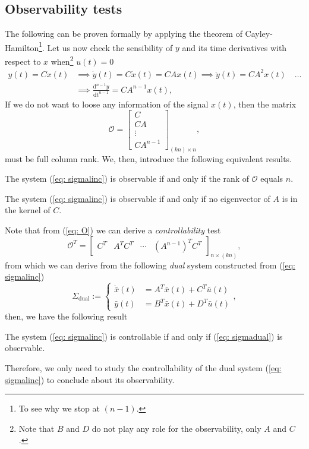 \subsection{Observability tests}
The following can be proven formally by applying the theorem of Cayley-Hamilton\footnote{To see why we stop at $(n-1)$.}. Let us now check the sensibility of $y$ and its time derivatives with respect to $x$ when\footnote{Note that $B$ and $D$ do not play any role for the observability, only $A$ and $C$.} $u(t)=0$
\begin{align}
	y(t) = Cx(t) &\implies \dot y(t) = C\dot x(t) = CAx(t) \implies \ddot y(t) = C A^2 x(t) \quad \dots \nonumber \\ &\implies \frac{\mathrm{d}^{n-1}y}{\mathrm{dt}^{n-1}} = CA^{n-1}x(t), \nonumber
\end{align}
If we do not want to loose any information of the signal $x(t)$, then the matrix
\begin{equation}
	\mathcal{O} = \begin{bmatrix}C \\ CA \\ \vdots \\ CA^{n-1}\end{bmatrix}_{(kn)\times n}, \label{eq: O}
\end{equation}
must be full column rank. We, then, introduce the following equivalent results.
\begin{theorem}
	The system (\ref{eq: sigmalinc}) is observable if and only if the rank of $\mathcal{O}$ equals $n$.
\end{theorem}
\begin{theorem}
The system (\ref{eq: sigmalinc}) is observable if and only if no eigenvector of $A$ is in the kernel of $C$.
\end{theorem}

Note that from (\ref{eq: O}) we can derive a \emph{controllability} test
\begin{equation}
	\mathcal{O}^T = \begin{bmatrix}C^T & A^TC^T & \cdots & (A^{n-1})^TC^T \end{bmatrix}_{n \times (kn)}, 
\end{equation}
from which we can derive from the following \emph{dual} system constructed from (\ref{eq: sigmalinc})
\begin{equation}
	\Sigma_{\text{dual}} := \begin{cases}
		\dot{\bar x}(t) &= A^T \bar x(t) + C^T \bar u(t) \\
		\bar y(t) &= B^T\bar x(t) + D^T\bar u(t)
	\end{cases},
\label{eq: sigmadual}
\end{equation}
then, we have the following result
\begin{theorem}
	The system (\ref{eq: sigmalinc}) is controllable if and only if (\ref{eq: sigmadual}) is observable.
\end{theorem}
Therefore, we only need to study the controllability of the dual system (\ref{eq: sigmalinc}) to conclude about its observability.

